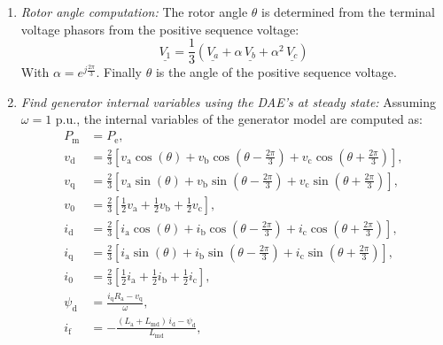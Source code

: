 \begin{enumerate}
\item \textit{Rotor angle computation:} The rotor angle $\theta$ is determined from the terminal voltage phasors from the positive sequence voltage:
\begin{equation}
\underline{V_1} = \frac{1}{3}\left( \underline{V_a} + \alpha \,\underline{V_b} + \alpha ^2\,\underline{V_c} \right)
\end{equation}
With $\alpha = e^{j \frac{2\pi}{3}}$. Finally $\theta$ is the angle of the positive sequence voltage.


\item \textit{Find generator internal variables using the DAE's at steady state:} Assuming $\omega = 1$ p.u., the internal variables of the generator model are computed as:
\begin{equation}
\begin{aligned}
    P_{\text{m}} &= P_{\text{e}}, \\[6pt]
    v_{\text{d}} &= \frac{2}{3}\left[        v_{\text{a}} \cos(\theta) +        v_{\text{b}} \cos\!\left(\theta - \frac{2\pi}{3}\right) +        v_{\text{c}}  \cos\!\left(\theta + \frac{2\pi}{3}\right)   \right], \\[6pt]
    v_{\text{q}} &= \frac{2}{3}\left[        v_{\text{a}} \sin(\theta) +        v_{\text{b}} \sin\!\left(\theta - \frac{2\pi}{3}\right) +        v_{\text{c}} \sin\!\left(\theta + \frac{2\pi}{3}\right)    \right], \\[6pt]
    v_{\text{0}} &= \frac{2}{3}\left[        \tfrac{1}{2}v_{\text{a}} +        \tfrac{1}{2}v_{\text{b}} +        \tfrac{1}{2}v_{\text{c}}    \right], \\[6pt]
    i_{\text{d}} &= \frac{2}{3}\left[        i_{\text{a}} \cos(\theta) +        i_{\text{b}} \cos\!\left(\theta - \frac{2\pi}{3}\right) +   i_{\text{c}} \cos\!\left(\theta + \frac{2\pi}{3}\right)    \right], \\[6pt]
    i_{\text{q}} &= \frac{2}{3}\left[        i_{\text{a}} \sin(\theta) +        i_{\text{b}} \sin\!\left(\theta - \frac{2\pi}{3}\right) +        i_{\text{c}} \sin\!\left(\theta + \frac{2\pi}{3}\right)    \right], \\[6pt]
    i_{\text{0}} &= \frac{2}{3}\left[        \tfrac{1}{2}i_{\text{a}} +        \tfrac{1}{2}i_{\text{b}} +        \tfrac{1}{2}i_{\text{c}}    \right], \\[6pt]
    \psi_{\text{d}} &= \frac{i_{\text{q}} R_{\text{a}} - v_{\text{q}}}{\omega}, \\[6pt]
    i_{\text{f}} &= -\frac{(L_{\text{a}} + L_{\text{md}})\,i_{\text{d}} - \psi_{\text{d}}}{L_{\text{md}}}, \\[6pt]

\end{aligned}
\end{equation}
\end{enumerate}
